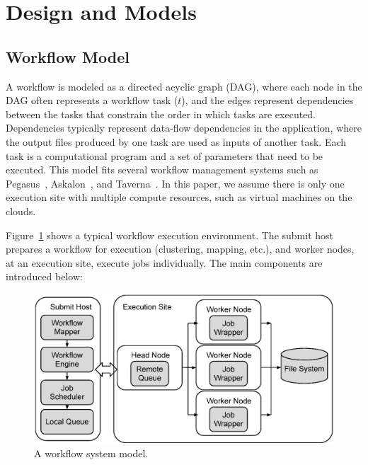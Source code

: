 \documentclass{IOS-Book-Article}
\begin{document}
\section{Design and Models}
\label{sec:models}



\subsection{Workflow Model}


\label{sec:model}


A workflow is modeled as a directed acyclic graph (DAG), where each node in the DAG often represents a workflow task ($t$), and the edges represent dependencies between the tasks that constrain the order in which tasks are executed. Dependencies typically represent data-flow dependencies in the application, where the output files produced by one task are used as inputs of another task. Each task is a computational program and a set of parameters that need to be executed. 
This model fits several workflow management systems such as Pegasus~\cite{Deelman2004}, Askalon~\cite{Fahringer2005}, and Taverna~\cite{Oinn2004}. In this paper, we assume there is only one execution site with multiple compute resources, such as virtual machines on the clouds. 


Figure~\ref{fig:model_system} shows a typical workflow execution environment. The submit host prepares a workflow for execution (clustering, mapping, etc.), and worker nodes, at an execution site, execute jobs individually. The main components are introduced below:

\begin{figure}[!htb]
\centering
  \includegraphics[width=0.95\linewidth]{figure2.eps}
  \caption{A workflow system model.}
  \label{fig:model_system}
\end{figure}
\end{document}
